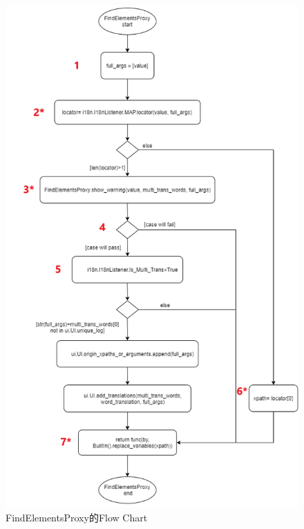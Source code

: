 \begin{figure}[H]
    \includegraphics[width= .85\textwidth]{../UML/i18n flow chart-FindElementsProxy.png}
    \caption{FindElementsProxy的Flow Chart}
    \label{FindElementsProxy的Flow Chart}
\end{figure}

